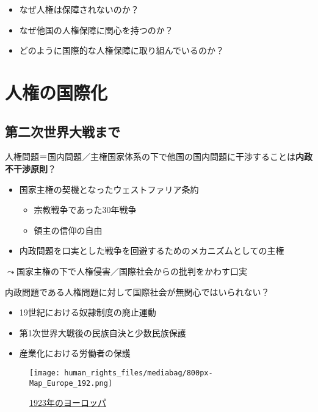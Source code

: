 \documentclass[
  xelatex,
  ja=standard]{bxjsarticle}
\providecommand{\tightlist}{%
  \setlength{\itemsep}{0pt}\setlength{\parskip}{0pt}}\usepackage{longtable,booktabs,array}
\begin{document}
\begin{itemize}
\tightlist
\item
  なぜ人権は保障されないのか？
\item
  なぜ他国の人権保障に関心を持つのか？
\item
  どのように国際的な人権保障に取り組んでいるのか？
\end{itemize}

\hypertarget{ux4ebaux6a29ux306eux56fdux969bux5316}{%
\section{人権の国際化}\label{ux4ebaux6a29ux306eux56fdux969bux5316}}

\hypertarget{ux7b2cux4e8cux6b21ux4e16ux754cux5927ux6226ux307eux3067}{%
\subsection{第二次世界大戦まで}\label{ux7b2cux4e8cux6b21ux4e16ux754cux5927ux6226ux307eux3067}}

人権問題＝国内問題／主権国家体系の下で他国の国内問題に干渉することは\textbf{内政不干渉原則}？

\begin{itemize}
\tightlist
\item
  国家主権の契機となったウェストファリア条約

  \begin{itemize}
  \tightlist
  \item
    宗教戦争であった30年戦争
  \item
    領主の信仰の自由
  \end{itemize}
\item
  内政問題を口実とした戦争を回避するためのメカニズムとしての主権
\end{itemize}

\(\leadsto\)国家主権の下で人権侵害／国際社会からの批判をかわす口実

内政問題である人権問題に対して国際社会が無関心ではいられない？

\begin{itemize}
\tightlist
\item
  19世紀における奴隷制度の廃止運動
\item
  第1次世界大戦後の民族自決と少数民族保護
\item
  産業化における労働者の保護
\end{itemize}

\begin{figure}[htpb]

{\centering \texttt{[image: human\_rights\_files/mediabag/800px-Map\_Europe\_192.png]}

}

\caption{\href{https://commons.wikimedia.org/wiki/File:Map_Europe_1923-en.svg}{1923年のヨーロッパ}}

\end{figure}
\end{document}
